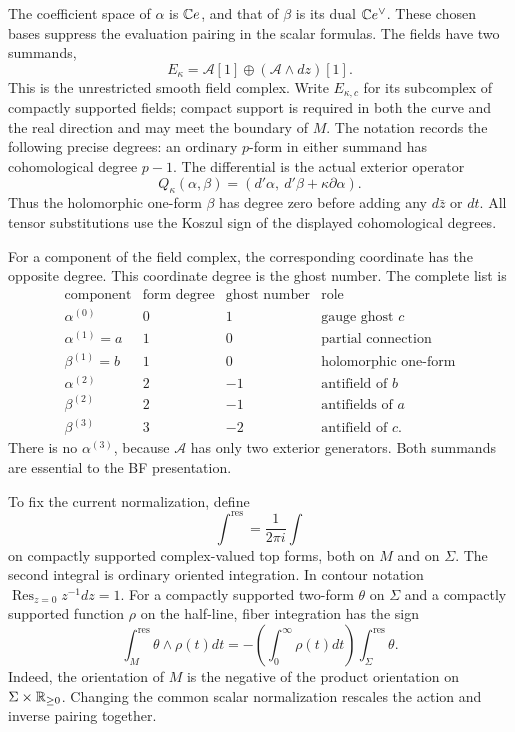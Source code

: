 The coefficient space of $\alpha$ is $\mathbb C e$, and that of $\beta$ is
its dual $\mathbb C e^\vee$.  These chosen bases suppress the evaluation
pairing in the scalar formulas.  The fields have two summands,
\[
 E_\kappa=\mathcal A[1]\oplus(\mathcal A\wedge dz)[1].
\]
This is the unrestricted smooth field complex.  Write $E_{\kappa,c}$
for its subcomplex of compactly supported fields; compact support is
required in both the curve and the real direction and may meet the
boundary of $M$.
The notation records the following precise degrees: an ordinary
$p$-form in either summand has cohomological degree $p-1$.
The differential is the actual exterior operator
\[
 Q_\kappa(\alpha,\beta)
   =(d'\alpha,\ d'\beta+\kappa\partial\alpha).
\]
Thus the holomorphic one-form $\beta$ has degree zero before adding
any $d\bar z$ or $dt$.  All tensor substitutions use the Koszul sign
of the displayed cohomological degrees.

For a component of the field complex, the corresponding coordinate
has the opposite degree.  This coordinate degree is the ghost number.
The complete list is
\[
\begin{array}{c|c|c|l}
 \text{component}&\text{form degree}&\text{ghost number}&\text{role}\\\hline
 \alpha^{(0)}&0&1&\text{gauge ghost }c\\
 \alpha^{(1)}=a&1&0&\text{partial connection}\\
 \beta^{(1)}=b&1&0&\text{holomorphic one-form}\\
 \alpha^{(2)}&2&-1&\text{antifield of }b\\
 \beta^{(2)}&2&-1&\text{antifields of }a\\
 \beta^{(3)}&3&-2&\text{antifield of }c .
\end{array}
\]
There is no $\alpha^{(3)}$, because $\mathcal A$ has only two
exterior generators.  Both summands are essential to the BF presentation.

To fix the current normalization, define
\[
 \int^{\mathrm{res}}=\frac1{2\pi i}\int
\]
on compactly supported complex-valued top forms, both on $M$ and on $\Sigma$.
The second integral is ordinary oriented integration.  In contour
notation $\operatorname{Res}_{z=0}z^{-1}dz=1$.
For a compactly supported two-form $\theta$ on $\Sigma$ and a
compactly supported function $\rho$ on the half-line, fiber integration
has the sign
\[
 \int_M^{\mathrm{res}}\theta\wedge\rho(t)dt
 =-\left(\int_0^\infty\rho(t)dt\right)
                  \int_\Sigma^{\mathrm{res}}\theta.
\]
Indeed, the orientation of $M$ is the negative of the product
orientation on $\Sigma\times\mathbb R_{\ge0}$.
Changing the common scalar normalization rescales the action and
inverse pairing together.

